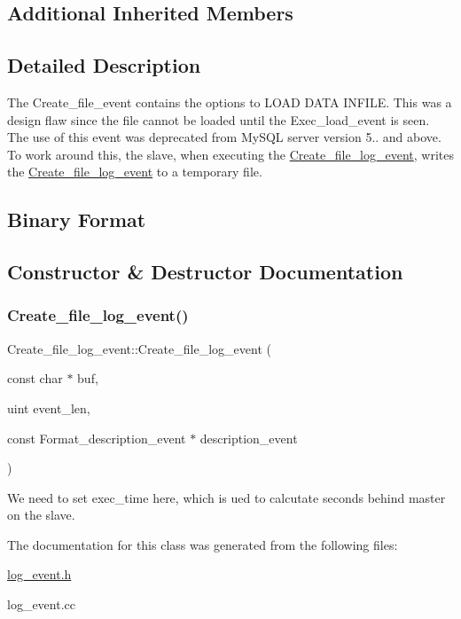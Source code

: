 \subsection*{Additional Inherited Members}


\subsection{Detailed Description}
The Create\+\_\+file\+\_\+event contains the options to L\+O\+AD D\+A\+TA I\+N\+F\+I\+LE. This was a design flaw since the file cannot be loaded until the Exec\+\_\+load\+\_\+event is seen. The use of this event was deprecated from My\+S\+QL server version 5.. and above. To work around this, the slave, when executing the \mbox{\hyperlink{classCreate__file__log__event}{Create\+\_\+file\+\_\+log\+\_\+event}}, writes the \mbox{\hyperlink{classCreate__file__log__event}{Create\+\_\+file\+\_\+log\+\_\+event}} to a temporary file.\hypertarget{classCreate__file__log__event_Create_file_log_event_binary_format}{}\subsection{Binary Format}\label{classCreate__file__log__event_Create_file_log_event_binary_format}


\subsection{Constructor \& Destructor Documentation}
\mbox{\label{classCreate__file__log__event_a88cc18c97980807dfdd4ffd6542bbc89}} 
\subsubsection{\texorpdfstring{Create\+\_\+file\+\_\+log\+\_\+event()}{Create\_file\_log\_event()}}
{\footnotesize\ttfamily Create\+\_\+file\+\_\+log\+\_\+event\+::\+Create\+\_\+file\+\_\+log\+\_\+event (\begin{DoxyParamCaption}\item[{const char $\ast$}]{buf,  }\item[{uint}]{event\+\_\+len,  }\item[{const Format\+\_\+description\+\_\+event $\ast$}]{description\+\_\+event }\end{DoxyParamCaption})}

We need to set exec\+\_\+time here, which is ued to calcutate seconds behind master on the slave.

The documentation for this class was generated from the following files\+:\begin{DoxyCompactItemize}
\item 
\mbox{\hyperlink{log__event_8h}{log\+\_\+event.\+h}}\item 
log\+\_\+event.\+cc\end{DoxyCompactItemize}

